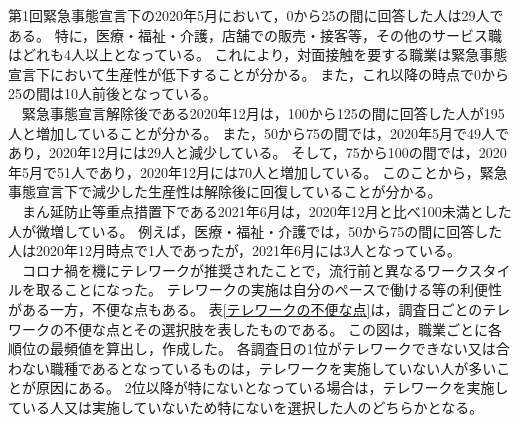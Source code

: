 \documentclass[paper={210mm,297mm},line_length=35zw,number_of_lines=31,head_space=30mm,gutter=40mm,baselineskip=2.0zw,headfoot_verticalposition=1.5zw]{jlreq}
\begin{document}
第1回緊急事態宣言下の2020年5月において，0から25の間に回答した人は29人である。
特に，医療・福祉・介護，店舗での販売・接客等，その他のサービス職はどれも4人以上となっている。
これにより，対面接触を要する職業は緊急事態宣言下において生産性が低下することが分かる。
また，これ以降の時点で0から25の間は10人前後となっている。\\
　緊急事態宣言解除後である2020年12月は，100から125の間に回答した人が195人と増加していることが分かる。
また，50から75の間では，2020年5月で49人であり，2020年12月には29人と減少している。
そして，75から100の間では，2020年5月で51人であり，2020年12月には70人と増加している。
このことから，緊急事態宣言下で減少した生産性は解除後に回復していることが分かる。\\
　まん延防止等重点措置下である2021年6月は，2020年12月と比べ100未満とした人が微増している。
例えば，医療・福祉・介護では，50から75の間に回答した人は2020年12月時点で1人であったが，2021年6月には3人となっている。\\
　コロナ禍を機にテレワークが推奨されたことで，流行前と異なるワークスタイルを取ることになった。
テレワークの実施は自分のペースで働ける等の利便性がある一方，不便な点もある。
表\ref{テレワークの不便な点}は，調査日ごとのテレワークの不便な点とその選択肢を表したものである。
この図は，職業ごとに各順位の最頻値を算出し，作成した。
各調査日の1位がテレワークできない又は合わない職種であるとなっているものは，テレワークを実施していない人が多いことが原因にある。
2位以降が特にないとなっている場合は，テレワークを実施している人又は実施していないため特にないを選択した人のどちらかとなる。\\
\end{document}

